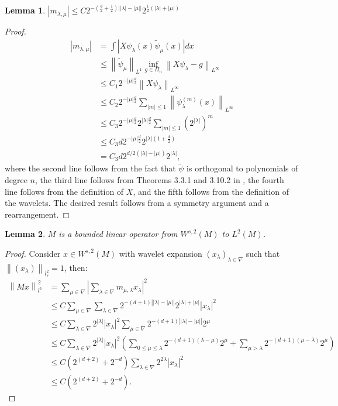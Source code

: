\documentclass[12pt]{amsart}
\newtheorem{lemma}{Lemma}
\newcommand{\card}[1]{{\lvert#1\rvert}}
\newcommand{\abs}[1]{\ensuremath{\left\lvert #1\right\rvert}}
\newcommand{\norm}[1]{\ensuremath{\left\lVert #1\right\rVert}}
\begin{document}
\begin{lemma}
	$\abs{m_{\lambda,\mu}} \leq C 2^{-(\frac{d}{2}+\frac{1}{2})\abs{\abs{\lambda}-\abs{\mu}}}2^{\frac{1}{2}(\abs{\lambda}+\abs{\mu})}$
\end{lemma}
\begin{proof}
	\begin{align}
		\abs{m_{\lambda,\mu}} 	&= \int \abs{X \psi_{\lambda}(x) \tilde{\psi}_{\mu}(x)} dx \\
								&\leq \norm{\tilde{\psi}_\mu}_{L^1}\inf_{g \in \Pi_n} \norm{X \psi_{\lambda} - g}_{L^{\infty}} \\
								&\leq C_1 2^{-\card{\mu}\frac{d}{2}}\norm{X\psi_{\lambda}}_{L^{\infty}} \\
								&\leq C_2 2^{-\card{\mu}\frac{d}{2}}\sum_{\card{m}\leq 1}\norm{\psi_{\lambda}^{(m)}(x)}_{L^{\infty}} \\
								&\leq C_3 2^{-\card{\mu}\frac{d}{2}} 2^{\card{\lambda}\frac{d}{2}} \sum_{\card{m}\leq 1} (2^{\card{\lambda}})^m \\
								&\leq C_3 d 2^{-\card{\mu}\frac{d}{2}} 2^{\card{\lambda}(1+\frac{d}{2})} \\
								&= C_3 d 2^{d/2(\card{\lambda} - \card{\mu})}2^{\card{\lambda}},
	\end{align}
	where the second line follows from the fact that $\tilde{\psi}$ is orthogonal to polynomials of degree $n$, the third line follows from Theorems 3.3.1 and 3.10.2 in \cite{}, the fourth line follows from the definition of $X$, and the fifth follows from the definition of the wavelets. The desired result follows from a symmetry argument and a rearrangement.
\end{proof}

\begin{lemma}
	$M$ is a bounded linear operator from $W^{s,2}(M)$ to $L^2(M)$.
\end{lemma}
\begin{proof}
	Consider $x \in W^{s,2}(M)$ with wavelet expansion $(x_\lambda)_{\lambda \in \nabla}$ such that $\norm{(x_\lambda)}_{l_s^2} = 1$, then:
	\begin{align}
		\norm{Mx}_{l^2}^2   &=    \sum_{\mu \in \nabla} \abs{ \sum_{\lambda \in \nabla} m_{\mu,\lambda} x_{\lambda} }^2 \\
							&\leq C\sum_{\mu \in \nabla} \sum_{\lambda \in \nabla} 2^{-(d+1)\abs{\card{\lambda} - \card{\mu}}} 2^{\card{\lambda}+\card{\mu}} \abs{x_\lambda}^2 \\
							&\leq C\sum_{\lambda \in \nabla} 2^{\card{\lambda}} \abs{x_\lambda}^2 \sum_{\mu \in \nabla} 2^{-(d+1)\abs{\card{\lambda}-\card{\mu}}}2^\mu \\
							&\leq C\sum_{\lambda \in \nabla}  2^{\card{\lambda}} \abs{x_\lambda}^2 \left( \sum_{0\leq\mu\leq\lambda} 2^{-(d+1)(\lambda - \mu)}2^{\mu} + \sum_{\mu > \lambda} 2^{-(d+1)(\mu-\lambda)}2^{\mu} \right) \\
							&\leq C(2^{(d+2)}+2^{-d}) \sum_{\lambda \in \nabla} 2^{2\lambda} \abs{x_{\lambda}}^2 \\
							&\leq C(2^{(d+2)}+2^{-d}).
	\end{align}
\end{proof}
\end{document}
